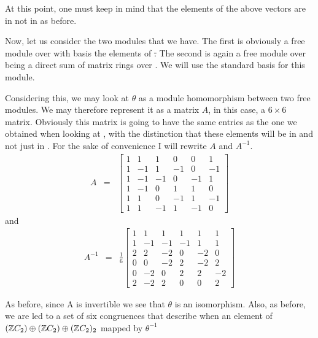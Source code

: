 \documentclass[11pt]{report}
\begin{document}
At this point, one must keep in mind that the elements of the 
above vectors are in \scr{}
not in \rat{} as before.

Now, let us consider the two modules that we have. The first \scr\st{}
is obviously a free
module over \scr{} with basis the elements of \st. The second is again a 
free module over \scr{} being
a direct sum of matrix rings over \scr. We will use the standard 
basis for this module.


        Considering this, we may look at $\theta$ as a module homomorphism 
between two free
modules. We may therefore represent it as a matrix $A$, in this 
case, a $6\times 6$ matrix. Obviously
this matrix is going to have the same entries as the one we 
obtained when looking at \intsth{},
with the distinction that these elements will be in \scr{} and not 
just in \rat. For the sake of
convenience I will rewrite $A$ and $A^{-1}$.
\begin{align*}
A&=&\begin{bmatrix}
1&1&1&0&0&1\\
        1& -1&    1&       -1&      0&       -1\\
        1& -1&    -1&      0&       -1&      1\\
        1& -1&    0&       1&       1&       0\\
        1&  1&    0&       -1&      1&       -1\\
        1&  1&    -1&      1&       -1&      0
\end{bmatrix}
\end{align*}
and
\begin{align*}
A^{-1}&=&\frac{1}{6}\begin{bmatrix}
1&1&1&1&1&1\\
        1& -1&    -1&      -1&      1&       1\\
        2&  2&    -2&      0&       -2&      0\\
        0& 0&     -2&      2&       -2&      2\\
        0& -2&    0&       2&       2&       -2\\
        2& -2&    2&       0&       0&       2
\end{bmatrix}
\end{align*}

As before, since A is invertible we see that $\theta$ is an isomorphism. 
Also, as before, we are led to a
set of six congruences that describe when an element of 
$( \mathbb{Z}C_2)\oplus( \mathbb{Z}C_2)\oplus( \mathbb{Z}C_2)_2$ mapped by $\theta^{-1}$
\end{document}
